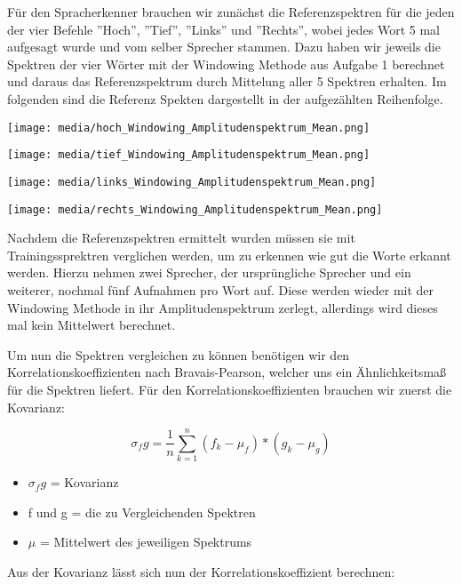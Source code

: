 Für den Spracherkenner brauchen wir zunächst die Referenzspektren für die jeden der vier Befehle ”Hoch”, ”Tief”, ”Links” und ”Rechts”, wobei jedes Wort 5 mal aufgesagt wurde und vom selber Sprecher stammen.
Dazu haben wir jeweils die Spektren der vier Wörter mit der Windowing Methode aus Aufgabe 1 berechnet und daraus das Referenzspektrum durch Mittelung aller 5 Spektren erhalten.
Im folgenden sind die Referenz Spekten dargestellt in der aufgezählten Reihenfolge.

\texttt{[image: media/hoch\_Windowing\_Amplitudenspektrum\_Mean.png]}


\texttt{[image: media/tief\_Windowing\_Amplitudenspektrum\_Mean.png]}


\texttt{[image: media/links\_Windowing\_Amplitudenspektrum\_Mean.png]}


\texttt{[image: media/rechts\_Windowing\_Amplitudenspektrum\_Mean.png]}



Nachdem die Referenzspektren ermittelt wurden müssen sie mit Trainingssprektren verglichen werden, um zu erkennen wie gut die Worte erkannt werden.
Hierzu nehmen zwei Sprecher, der ursprüngliche Sprecher und ein weiterer, nochmal fünf Aufnahmen pro Wort auf.
Diese werden wieder mit der Windowing Methode in ihr Amplitudenspektrum zerlegt, allerdings wird dieses mal kein Mittelwert berechnet.

Um nun die Spektren vergleichen zu können benötigen wir den Korrelationskoeffizienten nach Bravais-Pearson, welcher uns ein Ähnlichkeitsmaß für die Spektren liefert.
Für den Korrelationskoeffizienten brauchen wir zuerst die Kovarianz:

\begin{equation}
	\sigma_fg = \frac{1}{n} \sum_{k =1}^n (f_k - \mu_f) * (g_k - \mu_g) 
\end{equation}
\begin{itemize}
	\item $\sigma_fg $ = Kovarianz
	\item f und g = die zu Vergleichenden Spektren
	\item $\mu$ = Mittelwert des jeweiligen Spektrums
\end{itemize}

Aus der Kovarianz lässt sich nun der Korrelationskoeffizient berechnen:

